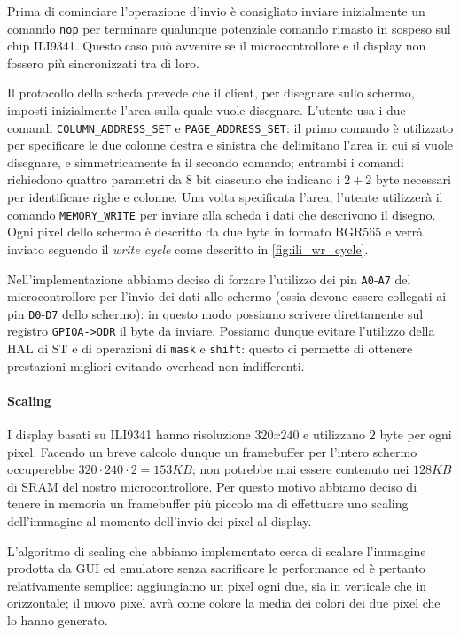 \documentclass[hidelinks,12pt]{article}
\begin{document}
Prima di cominciare l'operazione d'invio è consigliato inviare inizialmente
un comando \texttt{nop} per terminare qualunque potenziale comando rimasto in
sospeso sul chip ILI9341. Questo caso può avvenire se il microcontrollore e
il display non fossero più sincronizzati tra di loro.

Il protocollo della scheda prevede che il client, per disegnare sullo schermo,
imposti inizialmente l'area sulla quale vuole disegnare.
L'utente usa i due comandi \texttt{COLUMN\_ADDRESS\_SET} e
\texttt{PAGE\_ADDRESS\_SET}: il primo comando è utilizzato per specificare le
due colonne destra e sinistra che delimitano l'area in cui si vuole disegnare, e
simmetricamente fa il secondo comando; entrambi i comandi richiedono quattro
parametri da $8$ bit ciascuno che indicano i $2+2$ byte necessari per
identificare righe e colonne.
Una volta specificata l'area, l'utente utilizzerà il comando
\texttt{MEMORY\_WRITE} per inviare alla scheda i dati che descrivono il disegno.
Ogni pixel dello schermo è descritto da due byte in formato BGR565 e verrà
inviato seguendo il \textit{write cycle} come descritto in
\cref{fig:ili_wr_cycle}.

Nell'implementazione abbiamo deciso di forzare l'utilizzo dei pin
\texttt{A0}-\texttt{A7} del microcontrollore per l'invio dei dati allo schermo
(ossia devono essere collegati ai pin \texttt{D0}-\texttt{D7} dello schermo): in
questo modo possiamo scrivere direttamente sul registro \texttt{GPIOA->ODR} il
byte da inviare. Possiamo dunque evitare l'utilizzo della HAL di ST e di
operazioni di \texttt{mask} e \texttt{shift}: questo ci permette di ottenere
prestazioni migliori evitando overhead non indifferenti.

\paragraph{Scaling}
I display basati su ILI9341 hanno risoluzione $320x240$ e utilizzano $2$ byte
per ogni pixel. Facendo un breve calcolo dunque un framebuffer per l'intero
schermo occuperebbe $320 \cdot 240 \cdot 2 = 153KB$; non potrebbe mai essere
contenuto nei $128KB$ di SRAM del nostro microcontrollore.
Per questo motivo abbiamo deciso di tenere in memoria un framebuffer
più piccolo ma di effettuare uno scaling dell'immagine al momento dell'invio
dei pixel al display. 

L'algoritmo di scaling che abbiamo implementato cerca di scalare l'immagine
prodotta da GUI ed emulatore senza sacrificare le performance ed è pertanto
relativamente semplice: aggiungiamo un pixel ogni due, sia in verticale che in
orizzontale; il nuovo pixel avrà come colore la media dei colori dei due pixel
che lo hanno generato.
\end{document}
